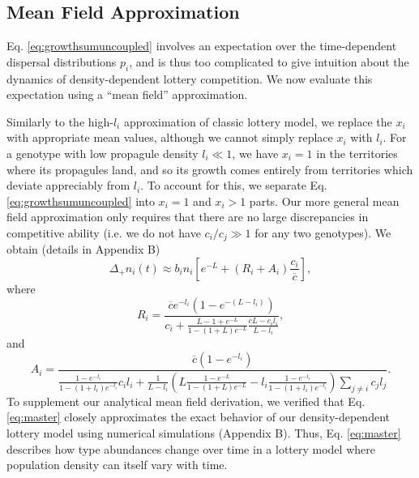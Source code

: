 \documentclass[11pt]{article}
\begin{document}
\subsection*{Mean Field Approximation}

Eq. \eqref{eq:growthsumuncoupled} involves an expectation over the time-dependent dispersal distributions $p_i$, and is thus too complicated to give intuition about the dynamics of density-dependent lottery competition. We now evaluate this expectation using a ``mean field'' approximation. 

Similarly to the high-$l_i$ approximation of classic lottery model, we replace the $x_i$ with appropriate mean values, although we cannot simply replace $x_i$ with $l_i$. For a genotype with low propagule density $l_i\ll 1$, we have $x_i=1$ in the territories where its propagules land, and so its growth comes entirely from territories which deviate appreciably from $l_i$. To account for this, we separate Eq. \eqref{eq:growthsumuncoupled} into $x_i=1$ and $x_i>1$ parts. Our more general mean field approximation only requires that there are no large discrepancies in competitive ability (i.e. we do not have $c_i/c_j\gg 1$ for any two genotypes). We obtain (details in Appendix B)
\begin{equation}
\Delta_+ n_i(t)\approx b_i n_i\left[e^{-L}+(R_i+A_i)\frac{c_i}{\overline{c}}\right], \label{eq:master}
\end{equation}
where
\begin{equation}
R_i=\frac{\overline{c}e^{-l_i}(1-e^{-(L-l_i)})}{c_i +\frac{L-1+e^{-L}}{1-(1+L)e^{-L}}\frac{\overline{c}L- c_il_i}{L-l_i}},\label{eq:Dr}
\end{equation}
and
\begin{equation}
A_i=\frac{\overline{c}(1-e^{-l_i})}{\frac{1-e^{-l_i}}{1-(1+l_i)e^{-l_i}}c_il_i+\frac{1}{L-l_i}\left(L\frac{1-e^{-L}}{1-(1+L)e^{-L}}-l_i\frac{1-e^{-l_i}}{1-(1+l_i)e^{-l_i}}\right)\sum_{j\neq i}c_jl_j}.\label{eq:Da}
\end{equation}
To supplement our analytical mean field derivation, we verified that Eq. \eqref{eq:master} closely approximates the exact behavior of our density-dependent lottery model using numerical simulations (Appendix B). Thus, Eq. \eqref{eq:master} describes how type abundances change over time in a lottery model where population density can itself vary with time.
\end{document}
